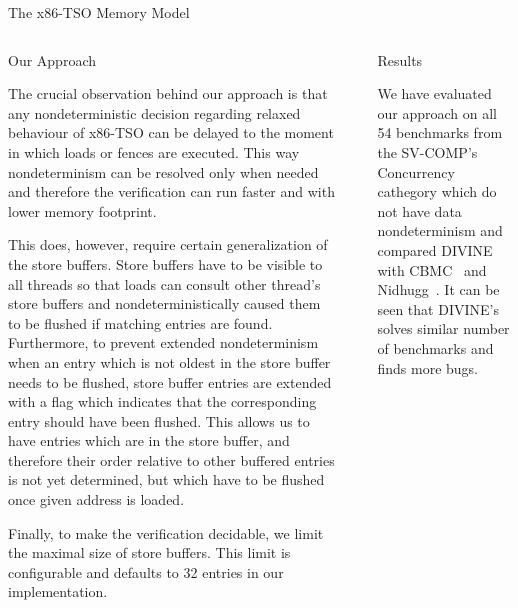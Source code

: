 \documentclass[final, 20pt, a0]{beamer}
\newlength{\sepwid}
\newlength{\onecolwid}
\newlength{\twocolwid}
\newcommand{\xtso}{x86-TSO\xspace}
\newcommand{\divine}{\mbox{DIVINE}\xspace}
\begin{document}
\begin{frame}[t]
\begin{columns}[t]
\begin{column}{\twocolwid}
\begin{block}{The \xtso Memory Model}
\end{block}

\begin{columns}[t,totalwidth=\twocolwid] %

\begin{column}{\onecolwid}

\begin{block}{Our Approach}

The crucial observation behind our approach is that any nondeterministic
decision regarding relaxed behaviour of \xtso can be delayed to the moment in
which loads or fences are executed. This way nondeterminism can be resolved
only when needed and therefore the verification can run faster and with lower
memory footprint.

This does, however, require certain generalization of the store buffers. Store
buffers have to be visible to all threads so that loads can consult other
thread's store buffers and nondeterministically caused them to be flushed if
matching entries are found. Furthermore, to prevent extended nondeterminism when
an entry which is not oldest in the store buffer needs to be flushed, store
buffer entries are extended with a flag which indicates that the corresponding
entry should have been flushed. This allows us to have entries which are in the
store buffer, and therefore their order relative to other buffered entries is
not yet determined, but which have to be flushed once given address is loaded.

Finally, to make the verification decidable, we limit the maximal size of store
buffers. This limit is configurable and defaults to 32 entries in our
implementation.

\end{block}


\end{column} %

\begin{column}{\sepwid}\end{column} %
\begin{column}{\onecolwid}

\begin{block}{Results}

We have evaluated our approach on all 54 benchmarks from the SV-COMP's
Concurrency cathegory which do not have data nondeterminism and compared \divine
with CBMC~\cite{Clarke2004} and Nidhugg~\cite{Abdulla2015}. It can be seen that
\divine's solves similar number of benchmarks and finds more bugs.


\end{block}
\end{column}
\end{columns}
\end{column}
\end{columns}
\end{frame}
\end{document}
